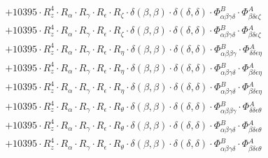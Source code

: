 \documentclass{article}
\begin{document}
\begin{subequations}
\begin{gather}
\begin{array}{c}
 \\[0.2em] 		 + 10395 \cdot R_{z}^{4} \cdot R_{\alpha{}} \cdot R_{\gamma{}} \cdot R_{\epsilon{}} \cdot R_{\zeta{}} \cdot \delta{}\left(\beta{}, \beta{}\right) \cdot \delta{}\left(\delta{}, \delta{}\right) \cdot \Phi{}^{B}_{\alpha{}\beta{}\gamma{}\delta{}} \cdot \Phi{}^{A}_{\beta{}\delta{}\epsilon{}\zeta{}} 
 \\[0.2em] 		 + 10395 \cdot R_{z}^{4} \cdot R_{\alpha{}} \cdot R_{\gamma{}} \cdot R_{\epsilon{}} \cdot R_{\zeta{}} \cdot \delta{}\left(\beta{}, \beta{}\right) \cdot \delta{}\left(\delta{}, \delta{}\right) \cdot \Phi{}^{B}_{\alpha{}\beta{}\gamma{}\delta{}} \cdot \Phi{}^{A}_{\beta{}\delta{}\epsilon{}\zeta{}} 
 \\[0.2em] 		 + 10395 \cdot R_{z}^{4} \cdot R_{\alpha{}} \cdot R_{\gamma{}} \cdot R_{\epsilon{}} \cdot R_{\eta{}} \cdot \delta{}\left(\beta{}, \beta{}\right) \cdot \delta{}\left(\delta{}, \delta{}\right) \cdot \Phi{}^{B}_{\alpha{}\beta{}\beta{}\gamma{}} \cdot \Phi{}^{A}_{\delta{}\delta{}\epsilon{}\eta{}} 
 \\[0.2em] 		 + 10395 \cdot R_{z}^{4} \cdot R_{\alpha{}} \cdot R_{\gamma{}} \cdot R_{\epsilon{}} \cdot R_{\eta{}} \cdot \delta{}\left(\beta{}, \beta{}\right) \cdot \delta{}\left(\delta{}, \delta{}\right) \cdot \Phi{}^{B}_{\alpha{}\beta{}\gamma{}\delta{}} \cdot \Phi{}^{A}_{\beta{}\delta{}\epsilon{}\eta{}} 
 \\[0.2em] 		 + 10395 \cdot R_{z}^{4} \cdot R_{\alpha{}} \cdot R_{\gamma{}} \cdot R_{\epsilon{}} \cdot R_{\eta{}} \cdot \delta{}\left(\beta{}, \beta{}\right) \cdot \delta{}\left(\delta{}, \delta{}\right) \cdot \Phi{}^{B}_{\alpha{}\beta{}\gamma{}\delta{}} \cdot \Phi{}^{A}_{\beta{}\delta{}\epsilon{}\eta{}} 
 \\[0.2em] 		 + 10395 \cdot R_{z}^{4} \cdot R_{\alpha{}} \cdot R_{\gamma{}} \cdot R_{\epsilon{}} \cdot R_{\theta{}} \cdot \delta{}\left(\beta{}, \beta{}\right) \cdot \delta{}\left(\delta{}, \delta{}\right) \cdot \Phi{}^{B}_{\alpha{}\beta{}\beta{}\gamma{}} \cdot \Phi{}^{A}_{\delta{}\delta{}\epsilon{}\theta{}} 
 \\[0.2em] 		 + 10395 \cdot R_{z}^{4} \cdot R_{\alpha{}} \cdot R_{\gamma{}} \cdot R_{\epsilon{}} \cdot R_{\theta{}} \cdot \delta{}\left(\beta{}, \beta{}\right) \cdot \delta{}\left(\delta{}, \delta{}\right) \cdot \Phi{}^{B}_{\alpha{}\beta{}\gamma{}\delta{}} \cdot \Phi{}^{A}_{\beta{}\delta{}\epsilon{}\theta{}} 
 \\[0.2em] 		 + 10395 \cdot R_{z}^{4} \cdot R_{\alpha{}} \cdot R_{\gamma{}} \cdot R_{\epsilon{}} \cdot R_{\theta{}} \cdot \delta{}\left(\beta{}, \beta{}\right) \cdot \delta{}\left(\delta{}, \delta{}\right) \cdot \Phi{}^{B}_{\alpha{}\beta{}\gamma{}\delta{}} \cdot \Phi{}^{A}_{\beta{}\delta{}\epsilon{}\theta{}} 

\end{array}
\end{gather}
\end{subequations}
\end{document}
